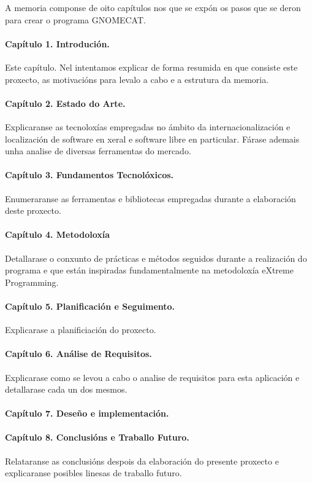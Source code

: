 A memoria componse de oito capítulos nos que se expón os pasos que se deron para crear o programa GNOMECAT.

\paragraph*{Capítulo 1. Introdución.}
Este capítulo. Nel intentamos explicar de forma resumida en que consiste este proxecto, as motivacións para levalo a cabo e a estrutura da memoria.

\paragraph*{Capítulo 2. Estado do Arte.}
Explicaranse as tecnoloxías empregadas no ámbito da internacionalización e localización de software en xeral e software libre en particular. Fárase ademais unha analise de diversas ferramentas do mercado.

\paragraph*{Capítulo 3. Fundamentos Tecnolóxicos.}
Enumeraranse as ferramentas e bibliotecas empregadas durante a elaboración deste proxecto.

\paragraph*{Capítulo 4. Metodoloxía}
Detallarase o conxunto de prácticas e métodos seguidos durante a realización do programa e que están inspiradas fundamentalmente na metodoloxía eXtreme Programming.

\paragraph*{Capítulo 5. Planificación e Seguimento.}
Explicarase a planificiación do proxecto.

\paragraph*{Capítulo 6. Análise de Requisitos.}
Explicarase como se levou a cabo o analise de requisitos para esta aplicación e detallarase cada un dos mesmos.

\paragraph*{Capítulo 7. Deseño e implementación.}

\paragraph*{Capítulo 8. Conclusións e Traballo Futuro.}
Relataranse as conclusións despois da elaboración do presente proxecto e explicaranse posibles linesas de traballo futuro.





